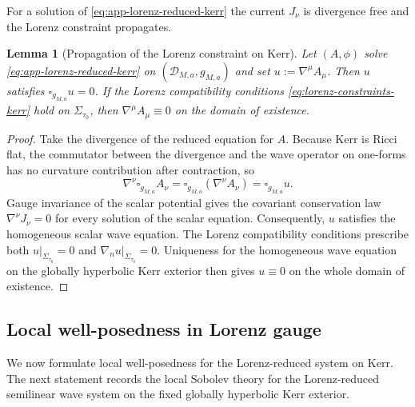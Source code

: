 \documentclass[11pt]{article}
\numberwithin{equation}{section}
\theoremstyle{plain}
\newtheorem{lemma}[theorem]{Lemma}
\theoremstyle{definition}
\theoremstyle{remark}
\begin{document}
For a solution of \eqref{eq:app-lorenz-reduced-kerr} the current $J_\nu$ is divergence free and the Lorenz constraint propagates.

\begin{lemma}[Propagation of the Lorenz constraint on Kerr]\label{lem:lorenz-propagation-kerr}
Let $(A,\phi)$ solve \eqref{eq:app-lorenz-reduced-kerr} on $(\mathcal D_{M,a},g_{M,a})$ and set $u:=\nabla^\mu A_\mu$.
Then $u$ satisfies $\square_{g_{M,a}}u=0$.
If the Lorenz compatibility conditions \eqref{eq:lorenz-constraints-kerr} hold on $\Sigma_{\tau_0}$, then $\nabla^\mu A_\mu\equiv 0$ on the domain of existence.
\end{lemma}

\begin{proof}
Take the divergence of the reduced equation for $A$.  Because Kerr is Ricci flat, the commutator between the divergence and the wave operator on one-forms has no curvature contribution after contraction, so
\[
\nabla^\nu\square_{g_{M,a}}A_\nu=\square_{g_{M,a}}(\nabla^\nu A_\nu)=\square_{g_{M,a}}u.
\]
Gauge invariance of the scalar potential gives the covariant conservation law $\nabla^\nu J_\nu=0$ for every solution of the scalar equation.  Consequently, $u$ satisfies the homogeneous scalar wave equation.  The Lorenz compatibility conditions prescribe both $u|_{\Sigma_{\tau_0}}=0$ and $\nabla_nu|_{\Sigma_{\tau_0}}=0$.  Uniqueness for the homogeneous wave equation on the globally hyperbolic Kerr exterior then gives $u\equiv0$ on the whole domain of existence.
\end{proof}

\subsection{Local well-posedness in Lorenz gauge}\label{app:kerr-lwp}

We now formulate local well-posedness for the Lorenz-reduced system on Kerr.
The next statement records the local Sobolev theory for the Lorenz-reduced semilinear wave system on the fixed globally hyperbolic Kerr exterior.
\end{document}
